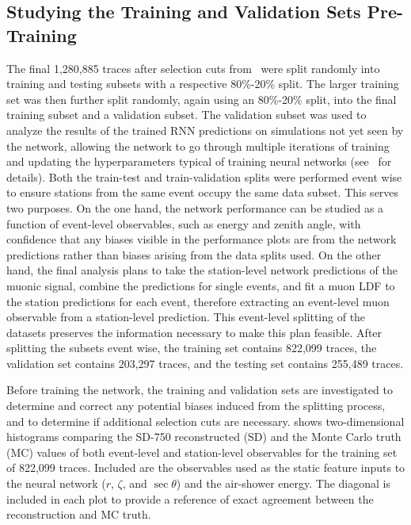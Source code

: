 \subsection{Studying the Training and Validation Sets Pre-Training}\label{ssec:pretraining}
The final 1,280,885 traces after selection cuts from~ were split randomly into training and testing subsets with a respective 80\%-20\% split.
The larger training set was then further split randomly, again using an 80\%-20\% split, into the final training subset and a validation subset.
The validation subset was used to analyze the results of the trained RNN predictions on simulations not yet seen by the network, allowing the network to go through multiple iterations of training and updating the hyperparameters typical of training neural networks (see~ for details).
Both the train-test and train-validation splits were performed event wise to ensure stations from the same event occupy the same data subset.
This serves two purposes.
On the one hand, the network performance can be studied as a function of event-level observables, such as energy and zenith angle, with confidence that any biases visible in the performance plots are from the network predictions rather than biases arising from the data splits used.
On the other hand, the final analysis plans to take the station-level network predictions of the muonic signal, combine the predictions for single events, and fit a muon LDF to the station predictions for each event, therefore extracting an event-level muon observable from a station-level prediction.
This event-level splitting of the datasets preserves the information necessary to make this plan feasible.
After splitting the subsets event wise, the training set contains 822,099 traces, the validation set contains 203,297 traces, and the testing set contains 255,489 traces.



Before training the network, the training and validation sets are investigated to determine and correct any potential biases induced from the splitting process, and to determine if additional selection cuts are necessary.
 shows two-dimensional histograms comparing the SD-750 reconstructed (SD) and the Monte Carlo truth (MC) values of both event-level and station-level observables for the training set of 822,099 traces.
Included are the observables used as the static feature inputs to the neural network ($r$, $\zeta$, and $\sec\theta$) and the air-shower energy.
The diagonal is included in each plot to provide a reference of exact agreement between the reconstruction and MC truth.

